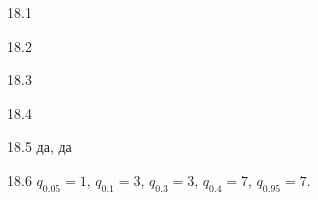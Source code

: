 \protect \hypertarget {soln:18.1}{}
\begin{solution}{{18.1}}
\end{solution}
\protect \hypertarget {soln:18.2}{}
\begin{solution}{{18.2}}
\end{solution}
\protect \hypertarget {soln:18.3}{}
\begin{solution}{{18.3}}
\end{solution}
\protect \hypertarget {soln:18.4}{}
\begin{solution}{{18.4}}
\end{solution}
\protect \hypertarget {soln:18.5}{}
\begin{solution}{{18.5}}
да, да
\end{solution}
\protect \hypertarget {soln:18.6}{}
\begin{solution}{{18.6}}
$q_{0.05} = 1$, $q_{0.1} = 3$, $q_{0.3} = 3$, $q_{0.4} = 7$, $q_{0.95}=7$.
\end{solution}
\protect \hypertarget {soln:18.7}{}
